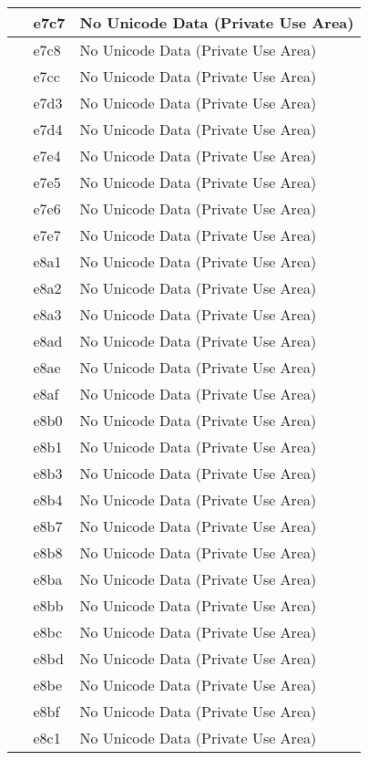 \documentclass[12pt,letterpaper,openany]{book}
\begin{document}
\begin{center}
\begin{supertabular}{|m{0.25in}|m{0.5in}|m{4in}|}
 & e7c7 & No Unicode Data (Private Use Area)\\\hline
 & e7c8 & No Unicode Data (Private Use Area)\\\hline
 & e7cc & No Unicode Data (Private Use Area)\\\hline
 & e7d3 & No Unicode Data (Private Use Area)\\\hline
 & e7d4 & No Unicode Data (Private Use Area)\\\hline
 & e7e4 & No Unicode Data (Private Use Area)\\\hline
 & e7e5 & No Unicode Data (Private Use Area)\\\hline
 & e7e6 & No Unicode Data (Private Use Area)\\\hline
 & e7e7 & No Unicode Data (Private Use Area)\\\hline
 & e8a1 & No Unicode Data (Private Use Area)\\\hline
 & e8a2 & No Unicode Data (Private Use Area)\\\hline
 & e8a3 & No Unicode Data (Private Use Area)\\\hline
 & e8ad & No Unicode Data (Private Use Area)\\\hline
 & e8ae & No Unicode Data (Private Use Area)\\\hline
 & e8af & No Unicode Data (Private Use Area)\\\hline
 & e8b0 & No Unicode Data (Private Use Area)\\\hline
 & e8b1 & No Unicode Data (Private Use Area)\\\hline
 & e8b3 & No Unicode Data (Private Use Area)\\\hline
 & e8b4 & No Unicode Data (Private Use Area)\\\hline
 & e8b7 & No Unicode Data (Private Use Area)\\\hline
 & e8b8 & No Unicode Data (Private Use Area)\\\hline
 & e8ba & No Unicode Data (Private Use Area)\\\hline
 & e8bb & No Unicode Data (Private Use Area)\\\hline
 & e8bc & No Unicode Data (Private Use Area)\\\hline
 & e8bd & No Unicode Data (Private Use Area)\\\hline
 & e8be & No Unicode Data (Private Use Area)\\\hline
 & e8bf & No Unicode Data (Private Use Area)\\\hline
 & e8c1 & No Unicode Data (Private Use Area)\\\hline

\end{supertabular}
\end{center}
\end{document}
